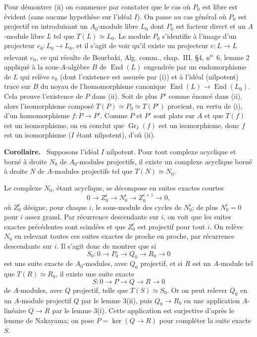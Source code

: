 \documentclass[11pt]{article}
\newenvironment{statement}[1]{\par\medskip\noindent\textbf{#1.}\ }{\par\medskip}
\providecommand{\End}{\operatorname{End}}
\providecommand{\End}{\operatorname{End}}
\begin{document}
Pour démontrer (ii) on commence par constater que le cas où $P_0$ est libre est évident (sans aucune hypothèse sur l'idéal $I$). On passe au cas général où $P_0$ est projectif en introduisant un $A_0$-module libre $L_0$ dont $P_0$ est facteur direct et un $A$-module libre $L$ tel que $T(L)\simeq L_0$. Le module $P_0$ s'identifie à l'image d'un projecteur $e_0:L_0\to L_0$, et il s'agit de voir qu'il existe un projecteur $e:L\to L$ relevant $e_0$, ce qui résulte de Bourbaki, Alg. comm., chap.~III, §4, n\textsuperscript{o}~6, lemme 2 appliqué à la sous-$A$-algèbre $B$ de $\End(L)$ engendrée par un endomorphisme de $L$ qui relève $e_0$ (dont l'existence est assurée par (i)) et à l'idéal (nilpotent) trace sur $B$ du noyau de l'homomorphisme canonique $\End(L)\to\End(L_0)$. Cela prouve l'existence de $P$ dans (ii). Soit de plus $P'$ comme énoncé dans (ii), alors l'isomorphisme composé $T(P)\simeq P_0\simeq T(P')$ provient, en vertu de (i), d'un homomorphisme $f:P\to P'$. Comme $P$ et $P'$ sont plats sur $A$ et que $T(f)$ est un isomorphisme, on en conclut que $\operatorname{Gr}_I(f)$ est un isomorphisme, donc $f$ est un isomorphisme ($I$ étant nilpotent), d'où (ii).

\begin{statement}{Corollaire}
Supposons l'idéal $I$ nilpotent. Pour tout complexe acyclique et borné à droite $N_0$ de $A_0$-modules projectifs, il existe un complexe acyclique borné à droite $N$ de $A$-modules projectifs tel que $T(N)\simeq N_0$.
\end{statement}

Le complexe $N_0$, étant acyclique, se décompose en suites exactes courtes
\[
0\longrightarrow Z_0^i\longrightarrow N_0^i\longrightarrow Z_0^{i+1}\longrightarrow0,
\]
où $Z_0^i$ désigne, pour chaque $i$, le sous-module des cycles de $N_0^i$; de plus $N_0^i=0$ pour $i$ assez grand. Par récurrence descendante sur $i$, on voit que les suites exactes précédentes sont scindées et que $Z_0^i$ est projectif pour tout $i$. On relève $N_0$ en relevant toutes ces suites exactes de proche en proche, par récurrence descendante sur $i$. Il s'agit donc de montrer que si
\[
S_0:0\longrightarrow P_0\longrightarrow Q_0\longrightarrow R_0\longrightarrow0
\]
est une suite exacte de $A_0$-modules, avec $Q_0$ projectif, et si $R$ est un $A$-module tel que $T(R)\simeq R_0$, il existe une suite exacte
\[
S:0\longrightarrow P\longrightarrow Q\longrightarrow R\longrightarrow0
\]
de $A$-modules, avec $Q$ projectif, telle que $T(S)\simeq S_0$. Or on peut relever $Q_0$ en un $A$-module projectif $Q$ par le lemme 3(ii), puis $Q_0\to R_0$ en une application $A$-linéaire $Q\to R$ par le lemme 3(i). Cette application est surjective d'après le lemme de Nakayama; on pose $P=\ker(Q\to R)$ pour compléter la suite exacte $S$.
\end{document}
